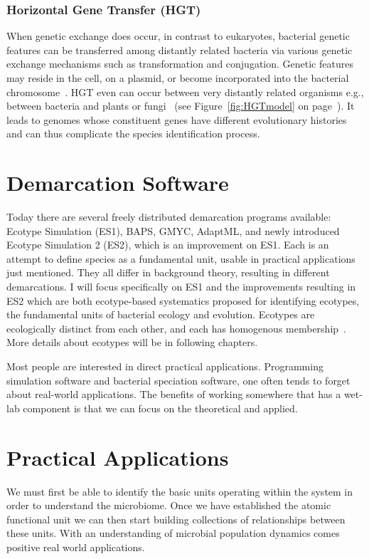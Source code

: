 \subsubsection*{Horizontal Gene Transfer (HGT)}
When genetic exchange does occur, in contrast to eukaryotes, bacterial genetic features can be transferred among distantly related bacteria via various genetic exchange mechanisms such as transformation and conjugation.
Genetic features may reside in the cell, on a plasmid, or become incorporated into the bacterial chromosome~\cite{staley1997biodiversity}.
HGT even can occur between very distantly related organisms e.g., between bacteria and plants or fungi~\cite{gogarten2002prokaryotic} (see Figure~\ref{fig:HGTmodel} on page~\pageref{fig:HGTmodel}).
It leads to genomes whose constituent genes have different evolutionary histories~\cite{gogarten2002prokaryotic} and can thus complicate the species identification process.


\section{Demarcation Software}
Today there are several freely distributed demarcation programs available: Ecotype Simulation (ES1), BAPS, GMYC, AdaptML, and newly introduced Ecotype Simulation 2 (ES2), which is an improvement on ES1.
Each is an attempt to define species as a fundamental unit, usable in practical applications just mentioned.
They all differ in background theory, resulting in different demarcations.
I will focus specifically on ES1 and the improvements resulting in ES2 which are both ecotype-based systematics proposed for identifying ecotypes, the fundamental units of bacterial ecology and evolution.
Ecotypes are ecologically distinct from each other, and each has homogenous membership~\cite{cohan2007systematics}.
More details about ecotypes will be in following chapters.

Most people are interested in direct practical applications.
Programming simulation software and bacterial speciation software, one often tends to forget about real-world applications.
The benefits of working somewhere that has a wet-lab component is that we can focus on the theoretical and applied.

\section{Practical Applications}
We must first be able to identify the basic units operating within the system in order to understand the microbiome.
Once we have established the atomic functional unit we can then start building collections of relationships between these units.
With an understanding of microbial population dynamics comes positive real world applications.

